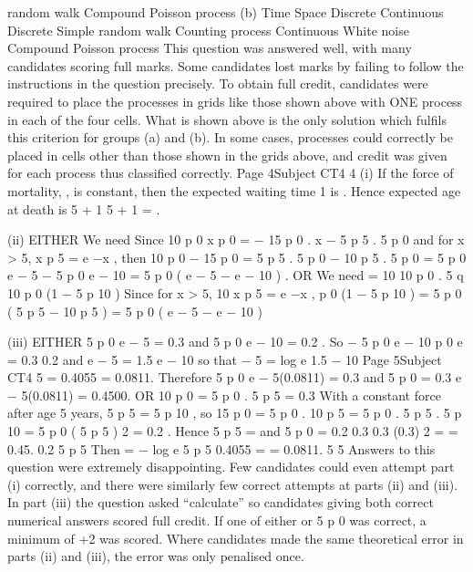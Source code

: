 random walk Compound
Poisson process
(b)
Time Space
Discrete
Continuous
Discrete Simple
random walk Counting
process
Continuous White noise Compound
Poisson process
This question was answered well, with many candidates scoring full marks. Some candidates
lost marks by failing to follow the instructions in the question precisely. To obtain full credit,
candidates were required to place the processes in grids like those shown above with ONE
process in each of the four cells. What is shown above is the only solution which fulfils this
criterion for groups (a) and (b). In some cases, processes could correctly be placed in cells
other than those shown in the grids above, and credit was given for each process thus
classified correctly.
Page 4Subject CT4 %
4
(i)
If the force of mortality, \mu, is constant, then the expected waiting time
1
is .
\mu
Hence expected age at death is 5 +
1 5 \mu + 1
=
.
\mu
\mu

(ii)
EITHER
We need
Since
10 p 0
x p 0
=
− 15 p 0 .
x − 5 p 5 . 5 p 0
and for x > 5,
x
p 5 = e −\mu x ,
then
10
p 0 − 15 p 0 = 5 p 5 . 5 p 0 − 10 p 5 . 5 p 0 = 5 p 0 e − 5 \mu − 5 p 0 e − 10 \mu = 5 p 0 ( e − 5 \mu − e − 10 \mu ) .
OR
We need
=
10
10
p 0 . 5 q 10
p 0 (1 − 5 p 10 )
Since for x > 5,
10
x
p 5 = e −\mu x ,
p 0 (1 − 5 p 10 ) = 5 p 0 ( 5 p 5 − 10 p 5 ) = 5 p 0 ( e − 5 \mu − e − 10 \mu )

(iii)
EITHER
5
p 0 e − 5 \mu = 0.3 and 5 p 0 e − 10 \mu = 0.2 .
So
− 5  p 0 e
− 10  p 0 e
=
0.3
0.2
and e − 5 \mu = 1.5 e − 10 \mu
so that − 5 \mu = log e 1.5 − 10 \mu
Page 5Subject CT4 %
5 \mu = 0.4055
\mu = 0.0811.
Therefore 5 p 0 e − 5(0.0811) = 0.3
and
5 p 0
=
0.3
e
− 5(0.0811)
= 0.4500.
OR
10
p 0 = 5 p 0 . 5 p 5 = 0.3
With a constant force after age 5 years, 5 p 5 = 5 p 10 ,
so 15 p 0 = 5 p 0 . 10 p 5 = 5 p 0 . 5 p 5 . 5 p 10 = 5 p 0 ( 5 p 5 ) 2 = 0.2 .
Hence 5 p 5 =
and 5 p 0 =
0.2
0.3
0.3 (0.3) 2
=
= 0.45.
0.2
5 p 5
Then \mu = −
log e 5 p 5 0.4055
=
= 0.0811.
5
5
Answers to this question were extremely disappointing. Few candidates could even attempt
part (i) correctly, and there were similarly few correct attempts at parts (ii) and (iii). In part
(iii) the question asked “calculate” so candidates giving both correct numerical answers
scored full credit. If one of either \mu or 5 p 0 was correct, a minimum of +2 was scored. Where
candidates made the same theoretical error in parts (ii) and (iii), the error was only
penalised once.
